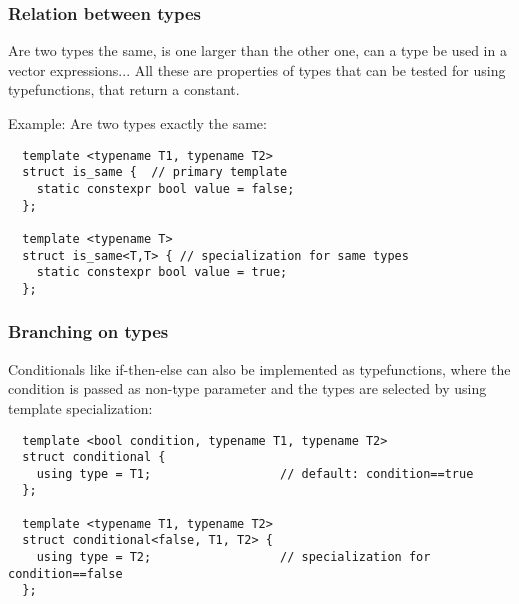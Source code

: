 \subsubsection{Relation between types}
Are two types the same, is one larger than the other one, can a type be used in a vector expressions... All these are properties of types that
can be tested for using typefunctions, that return a  constant.

Example: Are two types exactly the same:
\begin{verbatim}
  template <typename T1, typename T2>
  struct is_same {  // primary template
    static constexpr bool value = false;
  };

  template <typename T>
  struct is_same<T,T> { // specialization for same types
    static constexpr bool value = true;
  };
\end{verbatim}


\subsubsection{Branching on types}
Conditionals like if-then-else can also be implemented as typefunctions, where the condition is passed as non-type  parameter
and the types are selected by using template specialization:
\begin{verbatim}
  template <bool condition, typename T1, typename T2>
  struct conditional {
    using type = T1;                  // default: condition==true
  };

  template <typename T1, typename T2>
  struct conditional<false, T1, T2> {
    using type = T2;                  // specialization for condition==false
  };
\end{verbatim}
